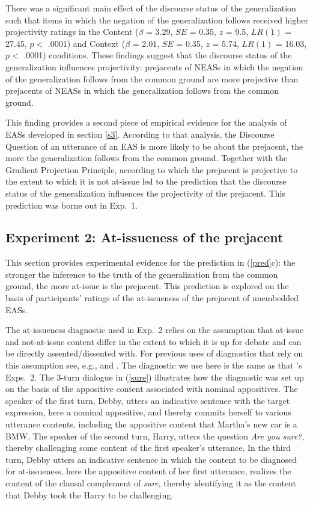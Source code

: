 \documentclass[11pt,fleqn]{article}
\newcommand{\6}{\mbox{$[\hspace*{-.6mm}[$}}
\newcommand{\9}{\mbox{$]\hspace*{-.6mm}]$}}
\newcommand{\citepos}[1]{\citeauthor{#1}'s \citeyear{#1}}
\begin{document}
There was a significant main effect of the discourse status of the generalization such that items in which the negation of the generalization follows received higher projectivity ratings in the Content ($\beta$ = 3.29, $SE$ = 0.35, $z$ = 9.5, $LR(1)$ = 27.45, $p <$ .0001) and Context ($\beta$ = 2.01, $SE$ = 0.35, $z$ = 5.74, $LR(1)$ = 16.03, $p <$ .0001) conditions. These findings suggest that the discourse status of the generalization influences projectivity: prejacents of NEASs in which the negation of the generalization follows from the common ground are more projective than prejacents of NEASs in which the generalization follows from the common ground.

This finding provides a second piece of empirical evidence for the analysis of EASs developed in section \ref{s3}. According to that analysis, the Discourse Question of an utterance of an EAS is more likely to be about the prejacent, the more the generalization follows from the common ground.  Together with the Gradient Projection Principle, according to which the prejacent is projective to the extent to which it is not at-issue led to the prediction that the discourse status of the generalization influences the projectivity of the prejacent. This prediction was borne out in Exp.~1.

\subsection{Experiment 2: At-issueness of the prejacent}\label{s43}

This section provides experimental evidence for the prediction in (\ref{pred}c): the stronger the inference to the truth of the generalization from the common ground, the more at-issue is the prejacent. This prediction is explored on the basis of participants' ratings of the at-issueness of the prejacent of unembedded EASs. 

The at-issueness diagnostic used in Exp.~2 relies on the assumption that at-issue and not-at-issue content differ in the extent to which it is up for debate and can be directly assented/dissented with. For previous uses of diagnostics that rely on this assumption see, e.g., \citealt{amaral-etal07,xue-onea11,murray2014,anderbois-etal2015,destruel-etal2015,tonhauser-sula6} and \citealt{syrett-koev2015}. The diagnostic we use here is the same as that \citepos{tbd-variability} Exps.~2. The 3-turn dialogue in (\ref{sure}) illustrates how the diagnostic was set up on the basis of the appositive content associated with nominal appositives. The speaker of the first turn, Debby, utters an indicative sentence with the target expression, here a nominal appositive, and thereby commits herself to various utterance contents, including the appositive content that Martha's new car is a BMW. The speaker of the second turn, Harry, utters the question {\em Are you sure?}, thereby challenging some content of the first speaker's utterance. In the third turn, Debby utters an indicative sentence in which the content to be diagnosed for at-issueness, here the appositive content of her first utterance, realizes the content of the clausal complement of {\em sure}, thereby identifying it as the content that Debby took the Harry to be challenging. 
\end{document}
